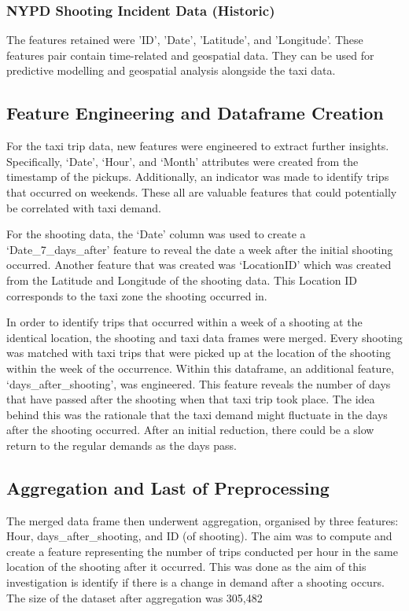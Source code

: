 \documentclass[11pt]{article}
\begin{document}
\subsubsection{NYPD Shooting Incident Data (Historic)}
\hspace{0pt}The features retained were 'ID', 'Date', 'Latitude', and 'Longitude'. These features pair contain time-related and geospatial data. They can be used for predictive modelling and geospatial analysis alongside the taxi data.

\subsection{Feature Engineering and Dataframe Creation}
\hspace{0pt}For the taxi trip data, new features were engineered to extract further insights. Specifically, ‘Date’, ‘Hour’, and ‘Month’ attributes were created from the timestamp of the pickups. Additionally, an indicator was made to identify trips that occurred on weekends. These all are valuable features that could potentially be correlated with taxi demand. 

For the shooting data, the ‘Date’ column was used to create a ‘Date\_7\_days\_after’ feature to reveal the date a week after the initial shooting occurred. Another feature that was created was  ‘LocationID’ which was created from the Latitude and Longitude of the shooting data. This Location ID corresponds to the taxi zone the shooting occurred in.

In order to identify trips that occurred within a week of a shooting at the identical location, the shooting and taxi data frames were merged. Every shooting was matched with taxi trips that were picked up at the location of the shooting within the week of the occurrence. Within this dataframe, an additional feature, ‘days\_after\_shooting’, was engineered. This feature reveals the number of days that have passed after the shooting when that taxi trip took place. The idea behind this was the rationale that the taxi demand might fluctuate in the days after the shooting occurred. After an initial reduction, there could be a slow return to the regular demands as the days pass. 

\subsection{Aggregation and Last of Preprocessing}
\hspace{0pt}The merged data frame then underwent aggregation, organised by three features: Hour, days\_after\_shooting, and ID (of shooting). The aim was to compute and create a feature representing the number of trips conducted per hour in the same location of the shooting after it occurred. This was done as the aim of this investigation is identify if there is a change in demand after a shooting occurs. The size of the dataset after aggregation was 305,482
\end{document}
